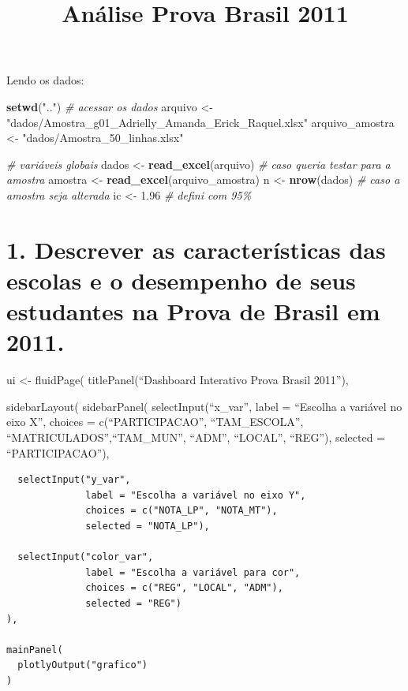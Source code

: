 \documentclass[
]{article}
\title{Análise Prova Brasil 2011}
\author{}
\date{\vspace{-2.5em}}
\newenvironment{Shaded}{\begin{snugshade}}{\end{snugshade}}
\newcommand{\CommentTok}[1]{\textcolor[rgb]{0.56,0.35,0.01}{\textit{#1}}}
\newcommand{\FloatTok}[1]{\textcolor[rgb]{0.00,0.00,0.81}{#1}}
\newcommand{\FunctionTok}[1]{\textcolor[rgb]{0.13,0.29,0.53}{\textbf{#1}}}
\newcommand{\NormalTok}[1]{#1}
\newcommand{\OtherTok}[1]{\textcolor[rgb]{0.56,0.35,0.01}{#1}}
\newcommand{\StringTok}[1]{\textcolor[rgb]{0.31,0.60,0.02}{#1}}
\begin{document}
\maketitle

Lendo os dados:

\begin{Shaded}
\begin{Highlighting}[]
\FunctionTok{setwd}\NormalTok{(}\StringTok{".."}\NormalTok{) }\CommentTok{\# acessar os dados}
\NormalTok{arquivo }\OtherTok{\textless{}{-}} \StringTok{"dados/Amostra\_g01\_Adrielly\_Amanda\_Erick\_Raquel.xlsx"}
\NormalTok{arquivo\_amostra }\OtherTok{\textless{}{-}} \StringTok{"dados/Amostra\_50\_linhas.xlsx"}

\CommentTok{\# variáveis globais}
\NormalTok{dados }\OtherTok{\textless{}{-}} \FunctionTok{read\_excel}\NormalTok{(arquivo) }\CommentTok{\# caso queria testar para a amostra}
\NormalTok{amostra }\OtherTok{\textless{}{-}} \FunctionTok{read\_excel}\NormalTok{(arquivo\_amostra)}
\NormalTok{n }\OtherTok{\textless{}{-}} \FunctionTok{nrow}\NormalTok{(dados) }\CommentTok{\# caso a amostra seja alterada}
\NormalTok{ic }\OtherTok{\textless{}{-}} \FloatTok{1.96} \CommentTok{\# defini com 95\%}
\end{Highlighting}
\end{Shaded}

\section{1. Descrever as características das escolas e o desempenho de
seus estudantes na Prova de Brasil em
2011.}\label{descrever-as-caracteruxedsticas-das-escolas-e-o-desempenho-de-seus-estudantes-na-prova-de-brasil-em-2011.}

ui \textless- fluidPage( titlePanel(``Dashboard Interativo Prova Brasil
2011''),

sidebarLayout( sidebarPanel( selectInput(``x\_var'', label = ``Escolha a
variável no eixo X'', choices = c(``PARTICIPACAO'', ``TAM\_ESCOLA'',
``MATRICULADOS'',``TAM\_MUN'', ``ADM'', ``LOCAL'', ``REG''), selected =
``PARTICIPACAO''),

\begin{verbatim}
  selectInput("y_var", 
              label = "Escolha a variável no eixo Y",
              choices = c("NOTA_LP", "NOTA_MT"),
              selected = "NOTA_LP"),
  
  selectInput("color_var", 
              label = "Escolha a variável para cor",
              choices = c("REG", "LOCAL", "ADM"),
              selected = "REG")
),

mainPanel(
  plotlyOutput("grafico")
)
\end{verbatim}
\end{document}
